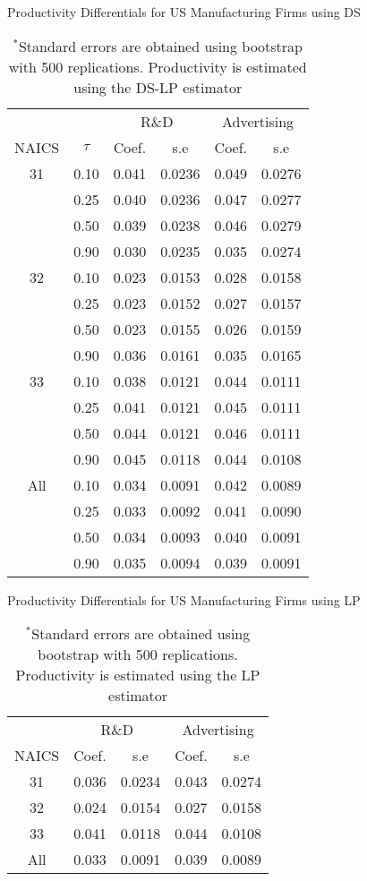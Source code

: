 \documentclass[11pt]{article}
\begin{document}
\begin{table}[H]
\centering
\caption{Productivity Differentials for US Manufacturing Firms using DS}
\begin{tabular}{cccccc}
  \hline\hline & & \multicolumn{2}{c}{R\&D}  & \multicolumn{2}{c}{Advertising} \\ \cmidrule(lr){3-4} \cmidrule(lr){5-6}NAICS & $\tau$ & Coef. & s.e & Coef. & s.e \\ 
  \hline
31 & 0.10 & 0.041 & 0.0236 & 0.049 & 0.0276 \\ 
   & 0.25 & 0.040 & 0.0236 & 0.047 & 0.0277 \\ 
   & 0.50 & 0.039 & 0.0238 & 0.046 & 0.0279 \\ 
   & 0.90 & 0.030 & 0.0235 & 0.035 & 0.0274 \\ 
  32 & 0.10 & 0.023 & 0.0153 & 0.028 & 0.0158 \\ 
   & 0.25 & 0.023 & 0.0152 & 0.027 & 0.0157 \\ 
   & 0.50 & 0.023 & 0.0155 & 0.026 & 0.0159 \\ 
   & 0.90 & 0.036 & 0.0161 & 0.035 & 0.0165 \\ 
  33 & 0.10 & 0.038 & 0.0121 & 0.044 & 0.0111 \\ 
   & 0.25 & 0.041 & 0.0121 & 0.045 & 0.0111 \\ 
   & 0.50 & 0.044 & 0.0121 & 0.046 & 0.0111 \\ 
   & 0.90 & 0.045 & 0.0118 & 0.044 & 0.0108 \\ 
  All & 0.10 & 0.034 & 0.0091 & 0.042 & 0.0089 \\ 
   & 0.25 & 0.033 & 0.0092 & 0.041 & 0.0090 \\ 
   & 0.50 & 0.034 & 0.0093 & 0.040 & 0.0091 \\ 
   & 0.90 & 0.035 & 0.0094 & 0.039 & 0.0091 \\ 
   \hline
\end{tabular}
\caption*{\footnotesize $^{*}$Standard errors are obtained using bootstrap with 500 replications. Productivity is estimated using the DS-LP estimator}
\end{table}

\begin{table}[H]
\centering
\caption{Productivity Differentials for US Manufacturing Firms using LP}
\begin{tabular}{ccccc}
  \hline\hline & \multicolumn{2}{c}{R\&D}  & \multicolumn{2}{c}{Advertising} \\ \cmidrule(lr){2-3} \cmidrule(lr){4-5}NAICS & Coef. & s.e & Coef. & s.e \\ 
  \hline
31 & 0.036 & 0.0234 & 0.043 & 0.0274 \\ 
  32 & 0.024 & 0.0154 & 0.027 & 0.0158 \\ 
  33 & 0.041 & 0.0118 & 0.044 & 0.0108 \\ 
  All & 0.033 & 0.0091 & 0.039 & 0.0089 \\ 
   \hline
\end{tabular}
\caption*{\footnotesize $^{*}$Standard errors are obtained using bootstrap with 500 replications. Productivity is estimated using the LP estimator}
\end{table}
\end{document}
